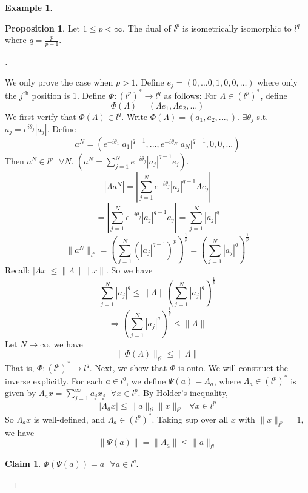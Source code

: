 \documentclass{article}
\theoremstyle{definition}
\newtheorem{ex}{Example}
\newtheorem{prop}{Proposition}
\newtheorem*{clm}{Claim}
\newenvironment{proofs}[1][\proofname]{%
  \begin{proof}[#1]$ $\par\nobreak\ignorespaces
}{%
  \end{proof}
}
\newcommand{\sfa}{\text{  } \forall}
\begin{document}
\begin{ex}
	\begin{prop}
		Let $1 \leq p < \infty$. The dual of $l^p$ is isometrically isomorphic to $l^q$ where $q = \frac{p}{p - 1}$.
	\end{prop}

	\begin{proofs}
		We only prove the case when $p > 1$. 
		Define $e_j = (0, \hdots 0, 1, 0, 0, \hdots)$ where only the $j^{\text{th}}$ position is 1.
		Define $\Phi: (l^p)^* \to l^q$ as follows:
		For $\Lambda \in (l^p)^*$, define 
		\[
			\Phi(\Lambda) = (\Lambda e_1, \Lambda e_2, \hdots )
		\]
		We first verify that $\Phi(\Lambda) \in l^q$.
		Write $\Phi(\Lambda)= (a_1, a_2, ...,)$.
		$\exists \theta_j$ s.t. $a_j = e^{i \theta_j} |a_j|$.
		Define 
		\[
			a^N = (e^{-i \theta_1}|a_1|^{q-1}, ..., e^{-i \theta_N}|a_N|^{q- 1}, 0, 0, ...)
		\]
		Then $a^N \in l^p \sfa N$.
		$(a^N = \sum_{j = 1}^N e^{-i \theta_j} |a_j|^{q - 1} e_j)$.
		\[
			|\Lambda a^N| = \left| \sum_{j = 1}^N e^{-i \theta_j} |a_j|^{q - 1} \Lambda e_j\right|
		\]
		\[
			= \left|\sum_{j =1}^N e^{-i \theta_j} |a_j|^{q - 1} a_j\right| = \sum_{j = 1}^N |a_j|^q
		\]
		\[
			\|a^N\|_{l^p} = \left( \sum_{j = 1}^N \left(|a_j|^{q - 1}\right)^{p} \right)^{\frac{1}{p}} = \left( \sum_{j = 1}^N |a_j|^q \right)^{\frac{1}{p}} 
		\]
		Recall: $|\Lambda x| \leq \|\Lambda \| \|x\|$.
		So we have 
		\[
			\sum_{j = 1}^N |a_j|^q \leq \|\Lambda\|\left(\sum_{j = 1}^N |a_j|^q\right)^{\frac{1}{p}}
		\]
		\[
			\Rightarrow \left( \sum_{j = 1}^N |a_j|^q\right)^{\frac{1}{q}} \leq \|\Lambda\|
		\]
		Let $N \to \infty$, we have
		\[
			\|\Phi(\Lambda)\|_{l^q} \leq \|\Lambda \|
		\]
		That is, $\Phi:(l^p)^* \to l^q$.
		Next, we show that $\Phi$ is onto.
		We will construct the inverse explicitly.
		For each $a \in l^q$, we define $\Psi(a) = \Lambda_a$, where $\Lambda_a \in (l^p)^*$ is given by $\Lambda_a x = \sum_{j = 1}^\infty a_j x_j \sfa x \in l^p$.
		By H\"older's inequality, 
		\[
			|\Lambda_a x| \leq \|a\|_{l^q} \|x\|_{l^p} \sfa x \in l^p
		\]
		So $\Lambda_a x$ is well-defined, and $\Lambda_a \in (l^p)^*$.
		Taking sup over all $x$ with $\|x\|_{l^p} = 1$, we have 
		\[
			\|\Psi(a)\| = \|\Lambda_a\| \leq \|a\|_{l^q}
		\]

		\begin{clm}
			$\Phi(\Psi(a)) = a \sfa a \in l^q$.
		\end{clm}


\end{proofs}
\end{ex}
\end{document}
